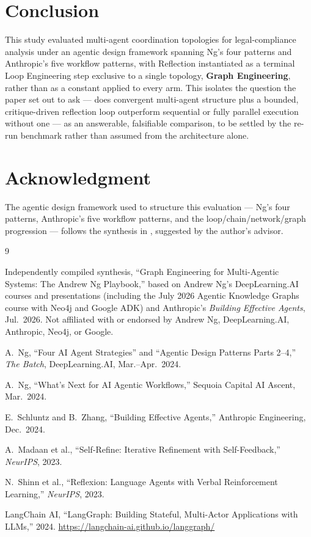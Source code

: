 \documentclass[journal,10pt,compsoc,onecolumn]{IEEEtran}
\begin{document}
\section{Conclusion}
This study evaluated multi-agent coordination topologies for legal-compliance analysis under an agentic design framework spanning Ng's four patterns and Anthropic's five workflow patterns, with Reflection instantiated as a terminal Loop Engineering step exclusive to a single topology, \textbf{Graph Engineering}, rather than as a constant applied to every arm. This isolates the question the paper set out to ask --- does convergent multi-agent structure plus a bounded, critique-driven reflection loop outperform sequential or fully parallel execution without one --- as an answerable, falsifiable comparison, to be settled by the re-run benchmark rather than assumed from the architecture alone.

\section*{Acknowledgment}
The agentic design framework used to structure this evaluation --- Ng's four patterns, Anthropic's five workflow patterns, and the loop/chain/network/graph progression --- follows the synthesis in \cite{ng_playbook_2026}, suggested by the author's advisor.

\begin{thebibliography}{9}

Independently compiled synthesis, ``Graph Engineering for Multi-Agentic Systems: The Andrew Ng Playbook,'' based on Andrew Ng's DeepLearning.AI courses and presentations (including the July 2026 Agentic Knowledge Graphs course with Neo4j and Google ADK) and Anthropic's \textit{Building Effective Agents}, Jul.\ 2026. Not affiliated with or endorsed by Andrew Ng, DeepLearning.AI, Anthropic, Neo4j, or Google.

A.\ Ng, ``Four AI Agent Strategies'' and ``Agentic Design Patterns Parts 2--4,'' \textit{The Batch}, DeepLearning.AI, Mar.--Apr.\ 2024.

A.\ Ng, ``What's Next for AI Agentic Workflows,'' Sequoia Capital AI Ascent, Mar.\ 2024.

E.\ Schluntz and B.\ Zhang, ``Building Effective Agents,'' Anthropic Engineering, Dec.\ 2024.

A.\ Madaan et al., ``Self-Refine: Iterative Refinement with Self-Feedback,'' \textit{NeurIPS}, 2023.

N.\ Shinn et al., ``Reflexion: Language Agents with Verbal Reinforcement Learning,'' \textit{NeurIPS}, 2023.

LangChain AI, ``LangGraph: Building Stateful, Multi-Actor Applications with LLMs,'' 2024. \url{https://langchain-ai.github.io/langgraph/}

\end{thebibliography}
\end{document}
